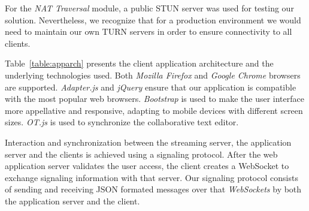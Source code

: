 \documentclass[10pt,conference]{IEEEtran}
\begin{document}
For the \emph{NAT Traversal} module, a public \gls{STUN} server was used for testing our solution.
Nevertheless, we recognize that for a production environment we would need to maintain our own \gls{TURN} servers in order to ensure connectivity to all clients.




Table~\ref{table:apparch} presents the client application architecture and the underlying technologies used.
Both \emph{Mozilla Firefox} and \emph{Google Chrome} browsers are supported.
\emph{Adapter.js} and \emph{jQuery} ensure that our application is compatible with the most popular web browsers.
\emph{Bootstrap} is used to make the user interface more appellative and responsive, adapting to mobile devices with different screen sizes.
\emph{OT.js} is used to synchronize the collaborative text editor.


\begin{table}
\centering
	\caption{Application Architecture}
	\label{table:apparch}

\end{table}



Interaction and synchronization between the streaming server, the application server and the clients is achieved using a signaling protocol.
After the web application server validates the user access, the client creates a WebSocket to exchange signaling information with that server. 
Our signaling protocol consists of sending and receiving \gls{JSON} formated messages over that \emph{WebSockets} by both the application server and the client. 
\end{document}
